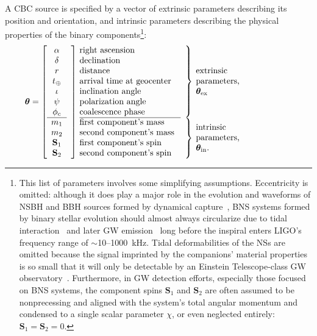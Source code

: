 \documentclass[amsmath,amssymb,aps,prx,reprint,nopreprintnumbers,nofootinbib]{revtex4-1}
\begin{document}
A \ac{CBC} source is specified by a vector of extrinsic parameters describing its position and orientation, and intrinsic parameters describing the physical properties of the binary components\footnote{This list of parameters involves some simplifying assumptions. Eccentricity is omitted: although it does play a major role in the evolution and waveforms of \ac{NSBH} and \ac{BBH} sources formed by dynamical capture~\citep{PhysRevD.87.043004}, \ac{BNS} systems formed by binary stellar evolution should almost always circularize due to tidal interaction~\citep{0004-637X-572-1-407} and later \ac{GW} emission~\citep{PhysRev.136.B1224} long before the inspiral enters LIGO's frequency range of $\sim$10\nobreakdashes--1000~kHz. Tidal deformabilities of the \acp{NS} are omitted because the signal imprinted by the companions' material properties is so small that it will only be detectable by an Einstein Telescope\nobreakdashes-class \ac{GW} observatory~\citep{PhysRevD.81.123016}. Furthermore, in \ac{GW} detection efforts, especially those focused on \ac{BNS} systems, the component spins $\mathbf{S}_1$ and $\mathbf{S}_2$ are often assumed to be nonprecessing and aligned with the system's total angular momentum and condensed to a single scalar parameter $\chi$, or even neglected entirely: $\mathbf{S}_1 = \mathbf{S}_2 = 0$.}:
%
\begin{equation}\label{eq:params}
    \bm\theta = \left[
    \begin{array}{cl@{\quad}p{4cm}lp{3.75cm}}
        \alpha & \rdelim]{11}{0mm} & right ascension & \rdelim\}{7}{1mm} & \multirow{7}{2cm}{extrinsic parameters, $\bm\theta_\mathrm{ex}$} \\
        \delta && declination & \\
        r && distance & \\
        t_\oplus && arrival time at geocenter & \\
        \iota && inclination angle & \\
        \psi && polarization angle & \\
        \phi_c && coalescence phase & \\
        \cline{1-1}\cline{3-3}
        m_1 && first component's mass & \rdelim\}{4}{1mm} & \multirow{4}{2cm}{intrinsic parameters, $\bm\theta_\mathrm{in}$.}\\
        m_2 && second component's mass & \\
        \mathbf S_1 && first component's spin & \\
        \mathbf S_2 && second component's spin & \\
    \end{array}\right.
\end{equation}
\end{document}
